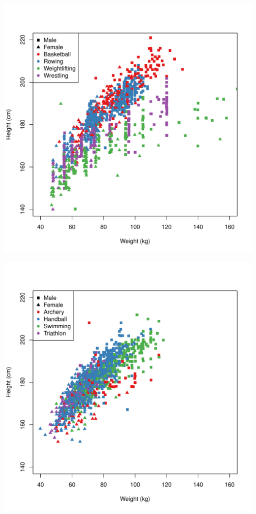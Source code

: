 \documentclass[landscape, paperwidth=42in, paperheight=36in,
fontscale=.35, margin=1in]{baposter}
\begin{document}
\begin{poster}
{  \begin{center}
  \begin{minipage}{0.45\textwidth}
    \begin{center}
      \includegraphics[scale=0.20]{../graphics/basketball.pdf}
    \end{center}
  \end{minipage}
  \hspace{0.05\textwidth}
  \begin{minipage}{0.45\textwidth}
    \begin{center}
      \includegraphics[scale=0.20]{../graphics/swimming.pdf}
    \end{center}
  \end{minipage}


\end{center}}
\end{poster}
\end{document}
